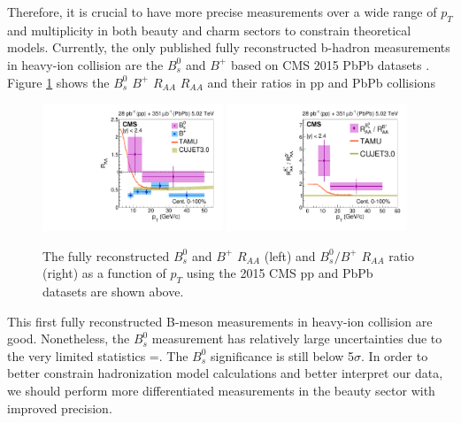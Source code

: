 
\clearpage

Therefore, it is crucial to have more precise measurements over a wide range of $p_T$ and multiplicity in both beauty and charm sectors to constrain theoretical models. Currently, the only published fully reconstructed b-hadron measurements in heavy-ion collision are the $B^0_s$ and $B^+$ based on CMS 2015 PbPb datasets \cite{CMSBsBP2015}. Figure \ref{BsBP2015} shows the $B^0_s$ $B^+$ $R_{AA}$ $R_{AA}$ and their ratios in pp and PbPb collisions

\begin{figure}[hbtp]
\begin{center}
\includegraphics[width=0.48\textwidth]{Figures/Chapter2/CMSBsBPRAA2015.pdf}
\includegraphics[width=0.48\textwidth]{Figures/Chapter2/CMSBsBP2015.pdf}
\caption{The fully reconstructed $B^0_s$ and $B^+$ $R_{AA}$ (left) and $B^0_s/B^+$ $R_{AA}$ ratio (right) as a function of $p_T$ using the 2015 CMS pp and PbPb datasets are shown above.}
\label{BsBP2015}
\end{center}
\end{figure}   


This first fully reconstructed B-meson measurements in heavy-ion collision are good. Nonetheless, the $B^0_s$ measurement has relatively large uncertainties due to the very limited statistics =. The $B^0_s$ significance is still below 5$\sigma$. In order to better constrain hadronization model calculations and better interpret our data, we should perform more differentiated measurements in the beauty sector with improved precision. 

